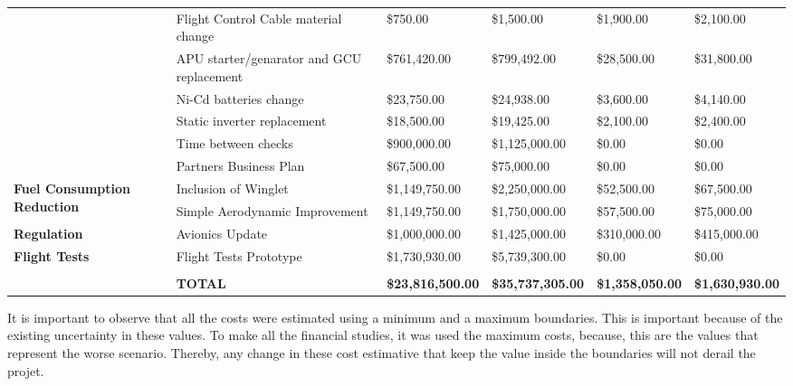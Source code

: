\begin{table}[H]
\begin{tabular}{| p{3cm} | p{4cm} | l | l | l | l |}
          & Flight Control Cable material change & \$750.00 & \$1,500.00 & \$1,900.00 & \$2,100.00 \\
          & APU starter/genarator and GCU replacement & \$761,420.00 & \$799,492.00 & \$28,500.00 & \$31,800.00 \\
          & Ni-Cd batteries change & \$23,750.00 & \$24,938.00 & \$3,600.00 & \$4,140.00 \\
          & Static inverter replacement & \$18,500.00 & \$19,425.00 & \$2,100.00 & \$2,400.00 \\
          & Time between checks & \$900,000.00 & \$1,125,000.00 & \$0.00 & \$0.00 \\
          & Partners Business Plan & \$67,500.00 & \$75,000.00 & \$0.00 & \$0.00 \\
    \multirow{2}[4]{*}{\textbf{Fuel Consumption Reduction}} & Inclusion of Winglet & \$1,149,750.00 & \$2,250,000.00 & \$52,500.00 & \$67,500.00 \\
          & Simple Aerodynamic Improvement & \$1,149,750.00 & \$1,750,000.00 & \$57,500.00 & \$75,000.00 \\
    \textbf{Regulation} & Avionics Update & \$1,000,000.00 & \$1,425,000.00 & \$310,000.00 & \$415,000.00 \\
    \textbf{Flight Tests} & Flight Tests Prototype & \$1,730,930.00 & \$5,739,300.00 & \$0.00 & \$0.00 \\
          &       &       &       &       &  \\
          & \textbf{TOTAL} & \textbf{\$23,816,500.00} & \textbf{\$35,737,305.00} & \textbf{\$1,358,050.00} & \textbf{\$1,630,930.00} \\
    \bottomrule
    \end{tabular}%
  \label{tab:costsCompilation}%
\end{table}%

It is important to observe that all the costs were estimated using a minimum and a maximum boundaries. This is important because of the existing uncertainty in these values. To make all the financial studies, it was used the maximum costs, because, this are the values that represent the worse scenario. Thereby, any change in these cost estimative that keep the value inside the boundaries will not derail the projet. 
